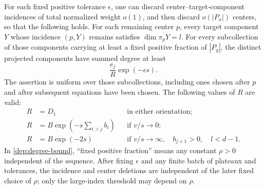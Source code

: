\begin{proposition}
\label{dep:projected-degree}
For each fixed positive tolerance $\epsilon$, one can discard
center--target-component incidences of total normalized weight
$o(1)$, and then discard $o(|P_x|)$ centers, so that the following
holds. For each remaining center $p$, every target component $Y$
whose incidence $(p,Y)$ remains satisfies
$\dim\overline{\pi_pY}=l$. For every subcollection of those components
carrying at least a fixed positive fraction of $|P_y|$, the distinct
projected components have summed degree at least
\begin{equation}\label{dep:degree-bound}
 \frac{e_j}{R}\exp(-\epsilon s).
\end{equation}
The assertion is uniform over those subcollections, including ones
chosen after $p$ and after subsequent equations have been chosen.
The following values of $R$ are valid:
\begin{align}
 R&=D_1 &&\text{in either orientation};
       \label{dep:first-R}\\
 R&=B\exp\left(-s\sum_{i>j}b_i\right)
       &&\text{if }v/s\longrightarrow0;
       \label{dep:narrow-R}\\
 R&=B\exp(-2s)
       &&\text{if }v/s\longrightarrow\infty,
          \quad b_{j+1}>0,\quad l<d-1.
       \label{dep:wide-R}
\end{align}
In \eqref{dep:degree-bound}, ``fixed positive fraction'' means any
constant $\rho>0$ independent of the sequence. After fixing
$\epsilon$ and any finite batch of plateaux and tolerances, the
incidence and center deletions are independent of the later fixed
choice of $\rho$; only the large-index threshold may depend on
$\rho$.
\end{proposition}

